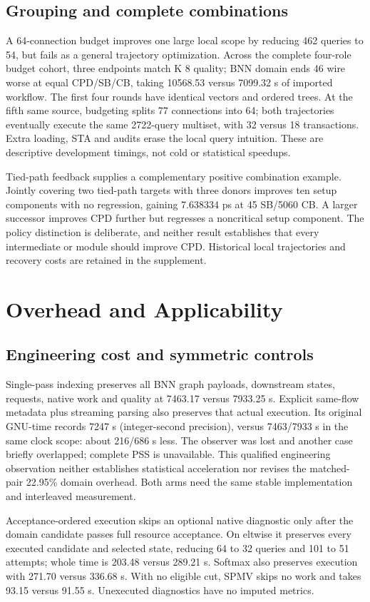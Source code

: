 \documentclass[conference,10pt]{IEEEtran}
\begin{document}
\subsection{Grouping and complete combinations}
A 64-connection budget improves one large local scope by reducing 462 queries to 54, but fails as a general trajectory optimization. Across the complete four-role budget cohort, three endpoints match K 8 quality; BNN domain ends 46 wire worse at equal CPD/SB/CB, taking 10568.53 versus 7099.32 s of imported workflow. The first four rounds have identical vectors and ordered trees. At the fifth same source, budgeting splits 77 connections into 64; both trajectories eventually execute the same 2722-query multiset, with 32 versus 18 transactions. Extra loading, STA and audits erase the local query intuition. These are descriptive development timings, not cold or statistical speedups.

Tied-path feedback supplies a complementary positive combination example. Jointly covering two tied-path targets with three donors improves ten setup components with no regression, gaining 7.638334 ps at 45 SB/5060 CB. A larger successor improves CPD further but regresses a noncritical setup component. The policy distinction is deliberate, and neither result establishes that every intermediate or module should improve CPD. Historical local trajectories and recovery costs are retained in the supplement.
\section{Overhead and Applicability}
\subsection{Engineering cost and symmetric controls}
Single-pass indexing preserves all BNN graph payloads, downstream states, requests, native work and quality at 7463.17 versus 7933.25 s. Explicit same-flow metadata plus streaming parsing also preserves that actual execution. Its original GNU-time records 7247 s (integer-second precision), versus 7463/7933 s in the same clock scope: about 216/686 s less. The observer was lost and another case briefly overlapped; complete PSS is unavailable. This qualified engineering observation neither establishes statistical acceleration nor revises the matched-pair 22.95\% domain overhead. Both arms need the same stable implementation and interleaved measurement.

Acceptance-ordered execution skips an optional native diagnostic only after the domain candidate passes full resource acceptance. On eltwise it preserves every executed candidate and selected state, reducing 64 to 32 queries and 101 to 51 attempts; whole time is 203.48 versus 289.21 s. Softmax also preserves execution with 271.70 versus 336.68 s. With no eligible cut, SPMV skips no work and takes 93.15 versus 91.55 s. Unexecuted diagnostics have no imputed metrics.
\end{document}
